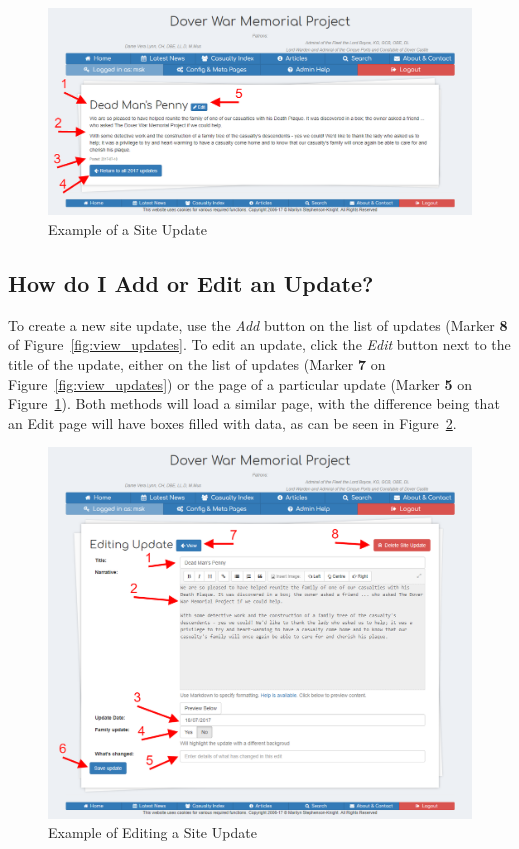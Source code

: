 \documentclass[12pt]{article}
\newcommand{\marker}[1]{Marker \color{red}\textbf{#1}\color{black}}
\begin{document}
\begin{figure}[h]
  \centering
 \includegraphics[width=.9\textwidth]{pics/view_update.png}
	\caption{Example of a Site Update}\label{fig:view_update}
\end{figure}

\newpage
\FloatBarrier
\subsection{How do I Add or Edit an Update?}\label{ssec:edit_update}
To create a new site update, use the \textit{Add} button on the list of updates (\marker{8} of Figure~\ref{fig:view_updates}. To edit an update, click the \textit{Edit} button next to the title of the update, either on the list of updates (\marker{7} on Figure~\ref{fig:view_updates}) or the page of a particular update (\marker{5} on Figure~\ref{fig:view_update}). Both methods will load a similar page, with the difference being that an Edit page will have boxes filled with data, as can be seen in Figure~\ref{fig:edit_update}.

\begin{figure}[h]
  \centering
 \includegraphics[width=.9\textwidth]{pics/edit_update.png}
	\caption{Example of Editing a Site Update}\label{fig:edit_update}
\end{figure}
\end{document}
